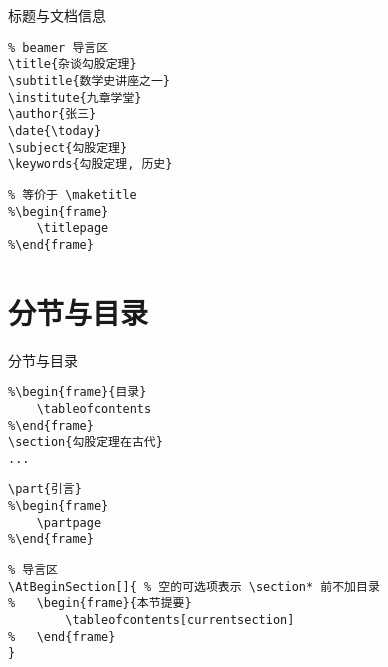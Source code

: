 \documentclass[11pt]{beamer}
\begin{document}
\begin{frame}[fragile]{标题与文档信息}
\begin{lstlisting}
% beamer 导言区
\title{杂谈勾股定理}
\subtitle{数学史讲座之一}
\institute{九章学堂}
\author{张三}
\date{\today}
\subject{勾股定理}
\keywords{勾股定理, 历史}
\end{lstlisting}
\begin{lstlisting}
% 等价于 \maketitle
%\begin{frame}
	\titlepage
%\end{frame}
\end{lstlisting}
\end{frame}

\section{分节与目录}

\begin{frame}[fragile]{分节与目录}
\begin{lstlisting}
%\begin{frame}{目录}
	\tableofcontents
%\end{frame}
\section{勾股定理在古代}
...
\end{lstlisting}
\begin{lstlisting}
\part{引言}
%\begin{frame}
	\partpage
%\end{frame}
\end{lstlisting}
\begin{lstlisting}
% 导言区
\AtBeginSection[]{ % 空的可选项表示 \section* 前不加目录
%	\begin{frame}{本节提要}
		\tableofcontents[currentsection]
%	\end{frame}
}
\end{lstlisting}
\end{frame}
	
\end{document}
